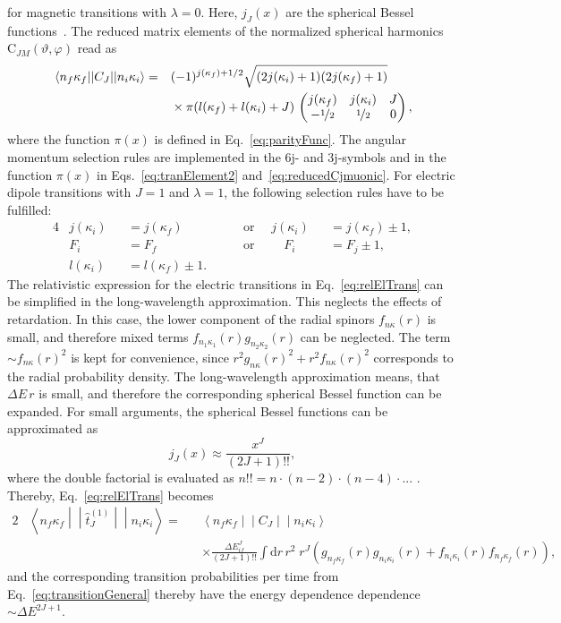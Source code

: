 for magnetic transitions with $\lambda = 0$. Here, $j_J(x)$ are the spherical Bessel functions~\cite[Eq. 10.47.3]{NIST:DLMF}.
The reduced matrix elements of the normalized spherical harmonics $\text{C}_{JM}(\vartheta,\varphi)$ read as~\cite{johnson2007}
\begin{alignat}{2}
&\left<n_f\kappa_f\middle|\middle|C_J\middle|\middle|n_i\kappa_i\right>=&&(-1)^{j(\kappa_f)+1/2}\sqrt{(2j(\kappa_i)+1)(2j(\kappa_f)+1)}\notag\\
&&& \times \pi(l(\kappa_f)+l(\kappa_i)+J)\,
\begin{pmatrix}
j(\kappa_f)&j(\kappa_i)&J\\
-\nicefrac{1}{2}&\nicefrac{1}{2}&0
\end{pmatrix},
\label{eq:reducedCjmuonic}
\end{alignat}
where the function $\pi(x)$ is defined in Eq.~\eqref{eq:parityFunc}. The angular momentum selection rules are implemented in the 6j- and 3j-symbols and in the function $\pi(x)$ in Eqs.~\eqref{eq:tranElement2} and~\eqref{eq:reducedCjmuonic}. For electric dipole transitions with $J=1$ and $\lambda=1$, the following selection rules have to be fulfilled:
\begin{alignat}{4}
&j(\kappa_i)&&=j(\kappa_f) &&\quad\text{ or }\quad j(\kappa_i)&&=j(\kappa_f)\pm 1,\\
&F_i &&= F_f &&\quad\text{ or }\quad\quad F_i&&=F_j\pm 1,\\
&l(\kappa_i)&&=l(\kappa_f)\pm 1.
\label{eq:dipoleSelectionRules}
\end{alignat}
The relativistic expression for the electric transitions in Eq.~\eqref{eq:relElTrans} can be simplified in the long-wavelength approximation. This neglects the effects of retardation. In this case, the lower component of the radial spinors $f_{n\kappa}(r)$ is small, and therefore mixed terms $f_{n_1\kappa_1}(r)g_{n_2\kappa_2}(r)$ can be neglected. The term $\sim f_{n\kappa}(r)^2$ is kept for convenience, since $r^2 g_{n\kappa}(r)^2+r^2 f_{n\kappa}(r)^2$ corresponds to the radial probability density. The long-wavelength approximation means, that $\Delta E \, r$ is small, and therefore the corresponding spherical Bessel function can be expanded. For small arguments, the spherical Bessel functions can be approximated as
\begin{equation}
j_J(x)\approx \frac{x^J}{(2J+1)!!},
\end{equation}
where the double factorial is evaluated as $n!! = n \cdot (n-2) \cdot (n-4) \cdot ...\,\,$. Thereby, Eq.~\eqref{eq:relElTrans} becomes
\begin{alignat}{2}
\label{eq:relElTransNR}
&\left< n_{f}\kappa_{f}\middle|\middle|\hat{t}^{(1)}_{J}\middle|\middle|n_{i}\kappa_{i}\right>=&&
\left<n_f\kappa_f\middle|\middle|C_J\middle|\middle|n_i\kappa_i\right>\\
&&&\times\frac{\Delta E_{if}^J}{(2J+1)!!}\int\text{d}r\,r^2 \;r^J\left(g_{n_f\kappa_f}(r)g_{n_i\kappa_i}(r)+f_{n_i\kappa_i}(r)f_{n_f\kappa_f}(r)\right),
\end{alignat}
and the corresponding transition probabilities per time from Eq.~\eqref{eq:transitionGeneral} thereby have the energy dependence dependence $\sim \Delta E ^{2J+1}$.\\

